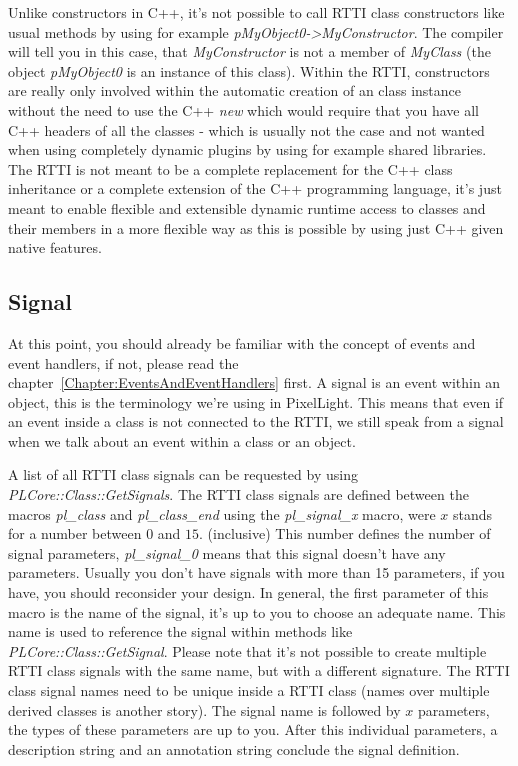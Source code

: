 Unlike constructors in C++, it's not possible to call RTTI class constructors like usual methods by using for example \emph{pMyObject0->MyConstructor}. The compiler will tell you in this case, that \emph{MyConstructor} is not a member of \emph{MyClass} (the object \emph{pMyObject0} is an instance of this class). Within the RTTI, constructors are really only involved within the automatic creation of an class instance without the need to use the C++ \emph{new} which would require that you have all C++ headers of all the classes - which is usually not the case and not wanted when using completely dynamic plugins by using for example shared libraries. The RTTI is not meant to be a complete replacement for the C++ class inheritance or a complete extension of the C++ programming language, it's just meant to enable flexible and extensible dynamic runtime access to classes and their members in a more flexible way as this is possible by using just C++ given native features.



\subsection{Signal}
At this point, you should already be familiar with the concept of events and event handlers, if not, please read the chapter~\ref{Chapter:EventsAndEventHandlers} first. A signal is an event within an object, this is the terminology we're using in PixelLight. This means that even if an event inside a class is not connected to the RTTI, we still speak from a signal when we talk about an event within a class or an object.

A list of all RTTI class signals can be requested by using \emph{PLCore::Class::GetSignals}. The RTTI class signals are defined between the macros \emph{pl\_class} and \emph{pl\_class\_end} using the \emph{pl\_signal\_x} macro, were $x$ stands for a number between $0$ and $15$. (inclusive) This number defines the number of signal parameters, \emph{pl\_signal\_0} means that this signal doesn't have any parameters. Usually you don't have signals with more than 15 parameters, if you have, you should reconsider your design. In general, the first parameter of this macro is the name of the signal, it's up to you to choose an adequate name. This name is used to reference the signal within methods like \emph{PLCore::Class::GetSignal}. Please note that it's not possible to create multiple RTTI class signals with the same name, but with a different signature. The RTTI class signal names need to be unique inside a RTTI class (names over multiple derived classes is another story). The signal name is followed by $x$ parameters, the types of these parameters are up to you. After this individual parameters, a description string and an annotation string conclude the signal definition.

